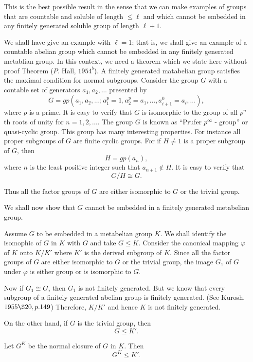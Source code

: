  This is the best possible result in the sense that we can make
 examples of groups that are countable and soluble of length $\le
 \ell$ and which cannot be embedded in any finitely generated soluble
 group of length $\ell +1$. 

 We shall have give an example with $\ell = 1$; that is, we shall give
 an example of a countable abelian group which cannot be embedded in
 any finitely generated metablian group. In this context, we need a
 theorem which we state here without proof Theorem ($P$. Hall,
 $1954^b$). A finitely generated matabelian group satisfies the
 maximal condition for normal subgroups. Consider the group $G$ with a
 contable set of generators $a_1,a_2,\ldots$ presented by 
 $$
 G = gp (a_1, a_2, \ldots ; a^p_1 = 1, a^p_2 = a_1, \ldots, a^0_{i+1}
 = a_i, \ldots), 
 $$
 where $p$ is a prime. It is easy to verify that $G$ is isomorphic to
 the group of all $p^n$ th roots of unity for $n = 1,2, \ldots$. The
 group $G$ is known as ``Prufer $p^\infty$ - group'' or quasi-cyclic
 group. This group has many interesting properties. For instance all
 proper subgroups of $G$ are finite cyclic groups. For if $H \neq 1$
 is a proper subgroup of $G$, then 
 $$
 H = gp (a_n),
 $$
 where $n$ is the least positive integer such that $a_{n+1} \notin
 H$. It is easy to verify that 
 $$
 G/H \cong G.
 $$
 
 Thus all the factor groups of $G$ are either isomorphic to $G$ or the
 trivial group.  

 We shall now show that $G$ cannot be embedded in a finitely generated
 metabelian group.  

 Assume $G$ to be embedded in a metabelian group $K$. We shall
 identify the isomophic of $G$ in $K$ with $G$ and take $G \le
 K$. Consider the canonical mapping $\varphi$ of $K$ onto $K/K'$ where
 $K'$ is the derived subgroup of $K$. Since all the factor groups of
 $G$ are either isomorphic to $G$ or the trivial group, the image
 $G_1$ of $G$ under $\varphi$ is either group or is isomorphic to
 $G$. 

 Now if $G_1 \cong G$, then $G_1$ is not finitely generated. But we
 know that every subgroup of a finitely generated abelian group is
 finitely generated. (See Kurosh, $1955 \S 20, p.149$) Therefore,
 $K/K'$ and hence $K$ is not finitely generated. 

 On the other hand, if $G$ is the trivial group, then
 $$
 G \le K'.
 $$

 Let $G^K$ be the normal closure of $G$ in $K$. Then
 $$
 G^K \le K'.
 $$

